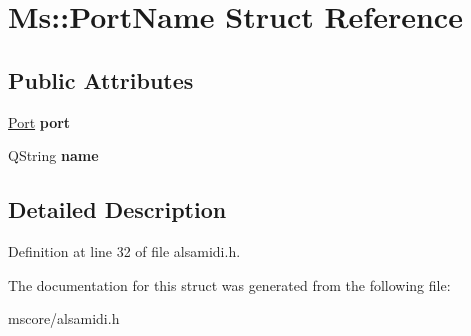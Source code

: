 \hypertarget{struct_ms_1_1_port_name}{}\section{Ms\+:\+:Port\+Name Struct Reference}
\label{struct_ms_1_1_port_name}
\subsection*{Public Attributes}
\begin{DoxyCompactItemize}
\item 
\mbox{\label{struct_ms_1_1_port_name_a10a72c7a2974e83d39db911c99d8675d}} 
\hyperlink{class_ms_1_1_port}{Port} {\bfseries port}
\item 
\mbox{\label{struct_ms_1_1_port_name_a0a04aeb238e0b9165979c29c2607c477}} 
Q\+String {\bfseries name}
\end{DoxyCompactItemize}


\subsection{Detailed Description}


Definition at line 32 of file alsamidi.\+h.



The documentation for this struct was generated from the following file\+:\begin{DoxyCompactItemize}
\item 
mscore/alsamidi.\+h\end{DoxyCompactItemize}
